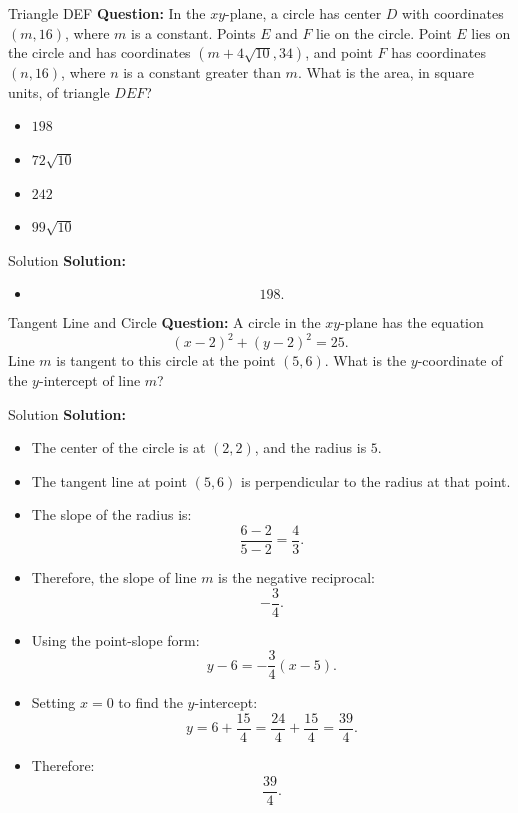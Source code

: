 \documentclass{beamer}
\begin{document}
\begin{frame}{Triangle DEF}
\textbf{Question:}  
In the \(xy\)-plane, a circle has center \(D\) with coordinates \((m,16)\), where \(m\) is a constant. Points \(E\) and \(F\) lie on the circle. Point \(E\) lies on the circle and has coordinates \((m+4\sqrt{10},34)\), and point \(F\) has coordinates \((n,16)\), where \(n\) is a constant greater than \(m\). What is the area, in square units, of triangle \(DEF\)?

\begin{itemize}
    \item[A] \(198\)
    \item[B] \(72\sqrt{10}\)
    \item[C] \(242\)
    \item[D] \(99\sqrt{10}\)
\end{itemize}
\end{frame}

\begin{frame}{Solution}
\textbf{Solution:}
\begin{itemize}

    \item 
    \[
    \boxed{198}.
    \]
\end{itemize}
\end{frame}


\begin{frame}{Tangent Line and Circle}
\textbf{Question:}  
A circle in the \(xy\)-plane has the equation 
\[
(x-2)^2 + (y-2)^2 = 25.
\] 
Line \(m\) is tangent to this circle at the point \((5,6)\). What is the \(y\)-coordinate of the \(y\)-intercept of line \(m\)?
\end{frame}

\begin{frame}{Solution}
\footnotesize
\textbf{Solution:}
\begin{itemize}
    \item The center of the circle is at \((2,2)\), and the radius is \(5\).
    \item The tangent line at point \((5,6)\) is perpendicular to the radius at that point.
    \item The slope of the radius is:
    \[
    \frac{6-2}{5-2} = \frac{4}{3}.
    \]
    \item Therefore, the slope of line \(m\) is the negative reciprocal:
    \[
    -\frac{3}{4}.
    \]
    \item Using the point-slope form:
    \[
    y - 6 = -\frac{3}{4}(x - 5).
    \]
    \item Setting \(x = 0\) to find the \(y\)-intercept:
    \[
    y = 6 + \frac{15}{4} = \frac{24}{4} + \frac{15}{4} = \frac{39}{4}.
    \]
    \item Therefore:
    \[
    \boxed{\frac{39}{4}}.
    \]
\end{itemize}
\end{frame}
\end{document}
